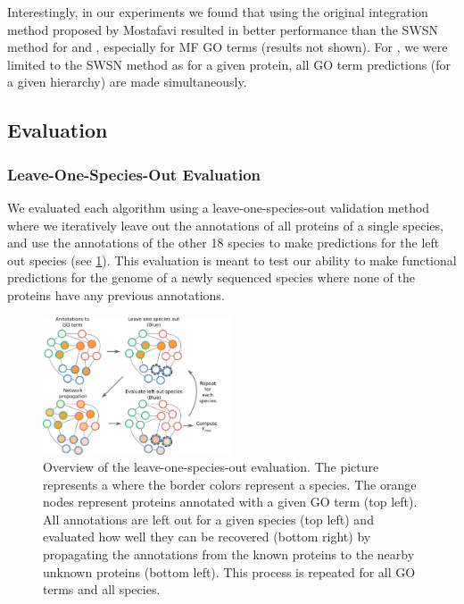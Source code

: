 Interestingly, in our experiments we found that using the original integration method proposed by Mostafavi \etal resulted in better performance than the SWSN method for \sinksource and \genemania, especially for MF GO terms (results not shown).
For \birgrank, we were limited to the SWSN method as for a given protein, all GO term predictions (for a given hierarchy) are made simultaneously.


\subsection{Evaluation}
\label{sec:evaluation}
\subsubsection{Leave-One-Species-Out Evaluation}
We evaluated each algorithm using a leave-one-species-out validation method where we iteratively leave out the annotations of all proteins of a single species, and use the annotations of the other 18 species to make predictions for the left out species (see \fig \ref{fig:leave-one-species-out}). This evaluation is meant to test our ability to make functional predictions for the genome of a newly sequenced species where none of the proteins have any previous annotations. 

\begin{figure}[htb]
    \centering
    \includegraphics[width=0.5\textwidth]{figs/leave-one-species-out.pdf}
    \caption{Overview of the leave-one-species-out evaluation. The picture represents a \SSN where the border colors represent a species. The orange nodes represent proteins annotated with a given GO term (top left). All annotations are left out for a given species (top left) and evaluated how well they can be recovered (bottom right) by propagating the annotations from the known proteins to the nearby unknown proteins (bottom left). This process is repeated for all GO terms and all species.}
    \label{fig:leave-one-species-out}
\end{figure}

